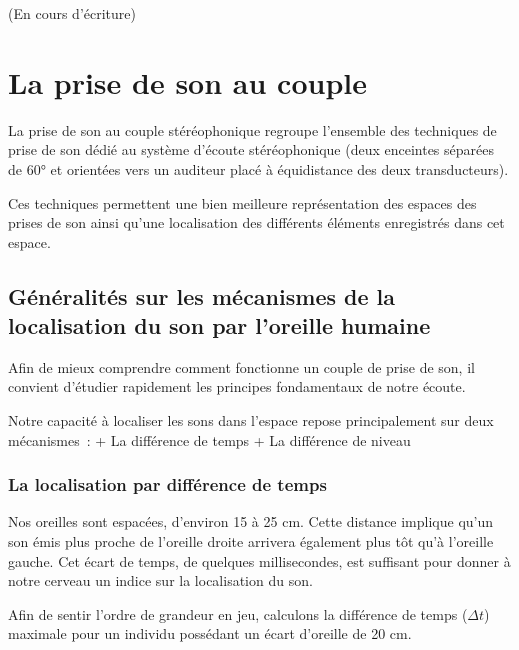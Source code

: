 \documentclass[
]{book}
\begin{document}
(En cours d'écriture)

\hypertarget{la-prise-de-son-au-couple}{%
\chapter{La prise de son au couple}\label{la-prise-de-son-au-couple}}

La prise de son au couple stéréophonique regroupe l'ensemble des techniques de prise de son dédié au système d'écoute stéréophonique (deux enceintes séparées de 60° et orientées vers un auditeur placé à équidistance des deux transducteurs).

Ces techniques permettent une bien meilleure représentation des espaces des prises de son ainsi qu'une localisation des différents éléments enregistrés dans cet espace.

\hypertarget{guxe9nuxe9ralituxe9s-sur-les-muxe9canismes-de-la-localisation-du-son-par-loreille-humaine}{%
\section{Généralités sur les mécanismes de la localisation du son par l'oreille humaine}\label{guxe9nuxe9ralituxe9s-sur-les-muxe9canismes-de-la-localisation-du-son-par-loreille-humaine}}

Afin de mieux comprendre comment fonctionne un couple de prise de son, il convient d'étudier rapidement les principes fondamentaux de notre écoute.

Notre capacité à localiser les sons dans l'espace repose principalement sur deux mécanismes~:
+ La différence de temps
+ La différence de niveau

\hypertarget{la-localisation-par-diffuxe9rence-de-temps}{%
\subsection{La localisation par différence de temps}\label{la-localisation-par-diffuxe9rence-de-temps}}

Nos oreilles sont espacées, d'environ 15 à 25 cm. Cette distance implique qu'un son émis plus proche de l'oreille droite arrivera également plus tôt qu'à l'oreille gauche. Cet écart de temps, de quelques millisecondes, est suffisant pour donner à notre cerveau un indice sur la localisation du son.

Afin de sentir l'ordre de grandeur en jeu, calculons la différence de temps (\(\Delta t\)) maximale pour un individu possédant un écart d'oreille de 20 cm.
\end{document}
